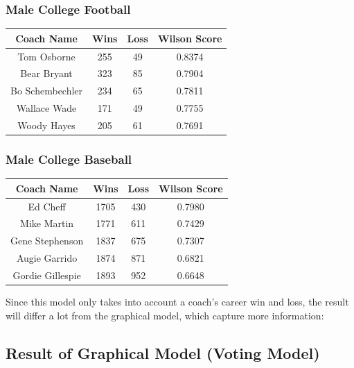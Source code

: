 \documentclass[titlepage]{article}
\begin{document}
\subsubsection*{Male College Football}

\begin{center}
\begin{tabular}{ | c | c | c| c |}
\hline
Coach Name       & Wins  & Loss & Wilson Score \\\hline
Tom Osborne      & 255   & 49   & 0.8374 \\\hline
Bear Bryant      & 323   & 85   & 0.7904 \\\hline
Bo Schembechler  & 234   & 65   & 0.7811 \\\hline
Wallace Wade     & 171   & 49   & 0.7755 \\\hline
Woody Hayes      & 205   & 61   & 0.7691 \\
\hline
\end{tabular}
\end{center}

\subsubsection*{Male College Baseball}

\begin{center}
\begin{tabular}{ | c | c | c| c | }
\hline
Coach Name       & Wins   & Loss & Wilson Score \\\hline
Ed Cheff         & 1705   & 430  & 0.7980 \\\hline
Mike Martin      & 1771   & 611  & 0.7429 \\\hline
Gene Stephenson  & 1837   & 675  & 0.7307 \\\hline
Augie Garrido    & 1874   & 871  & 0.6821 \\\hline
Gordie Gillespie & 1893   & 952  & 0.6648 \\
\hline
\end{tabular}
\end{center}

\noindent Since this model only takes into account a coach's career win and loss, the result will differ a lot from the graphical model, which capture more information:

\subsection{Result of Graphical Model (Voting Model)}
\end{document}
